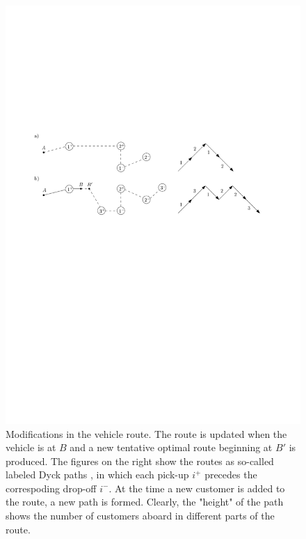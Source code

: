 \documentclass[dissertation,draft*]{aaltoseries}
\begin{document}
\begin{figure}[ht]
\begin{center}
\includegraphics[width=1.0\textwidth]{dynamicexample04.pdf}
\caption{Modifications in the vehicle route. The route is updated when the vehicle is at $B$ and 
a new tentative optimal route beginning at $B'$ is produced. 
The figures on the right show the routes as so-called labeled Dyck 
paths \cite{cori}, in which each pick-up $i^{+}$ precedes the correspoding drop-off $i^{-}$. 
At the time a new customer is added to the route, a new path is formed. Clearly, the "height" of the path
shows the number of customers aboard in different parts of the route.}
\label{dynamicexample02}
\end{center}
\end{figure}
\end{document}
